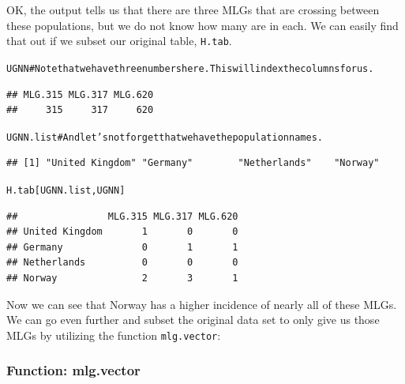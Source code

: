 \documentclass[letterpaper]{article}\usepackage[]{graphicx}\usepackage[]{color}
\makeatletter
\newcommand{\hlcom}[1]{\textcolor[rgb]{1,0.502,0}{#1}}%
\newcommand{\hlstd}[1]{\textcolor[rgb]{0,0,0}{#1}}%
\newenvironment{kframe}{%
 \def\at@end@of@kframe{}%
 \ifinner\ifhmode%
  \def\at@end@of@kframe{\end{minipage}}%
  \begin{minipage}{\columnwidth}%
 \fi\fi%
 \def\FrameCommand##1{\hskip\@totalleftmargin \hskip-\fboxsep
 \colorbox{shadecolor}{##1}\hskip-\fboxsep
     \hskip-\linewidth \hskip-\@totalleftmargin \hskip\columnwidth}%
 \MakeFramed {\advance\hsize-\width
   \@totalleftmargin\z@ \linewidth\hsize
   \@setminipage}}%
 {\par\unskip\endMakeFramed%
 \at@end@of@kframe}
\newenvironment{knitrout}{}{} %
\makeatother
\begin{document}
OK, the output tells us that there are three MLGs that are crossing between these
populations, but we do not know how many are in each. We can easily find that out if we subset our original table, \texttt{H.tab}. 

\begin{knitrout}\footnotesize
{}\color{fgcolor}\begin{kframe}
\begin{alltt}
\hlstd{UGNN}  \hlcom{# Note that we have three numbers here. This will index the columns for us.}
\end{alltt}
\begin{verbatim}
## MLG.315 MLG.317 MLG.620 
##     315     317     620
\end{verbatim}
\begin{alltt}
\hlstd{UGNN.list}  \hlcom{# And let's not forget that we have the population names.}
\end{alltt}
\begin{verbatim}
## [1] "United Kingdom" "Germany"        "Netherlands"    "Norway"
\end{verbatim}
\begin{alltt}
\hlstd{H.tab[UGNN.list, UGNN]}
\end{alltt}
\begin{verbatim}
##                MLG.315 MLG.317 MLG.620
## United Kingdom       1       0       0
## Germany              0       1       1
## Netherlands          0       0       0
## Norway               2       3       1
\end{verbatim}
\end{kframe}
\end{knitrout}


Now we can see that Norway has a higher incidence of nearly all of these MLGs. 
We can go even further and subset the original data set to only give us those MLGs by utilizing the function \texttt{mlg.vector}:
\subsubsection{Function: mlg.vector}\label{mlg:mix:mlg.vector}
\end{document}
